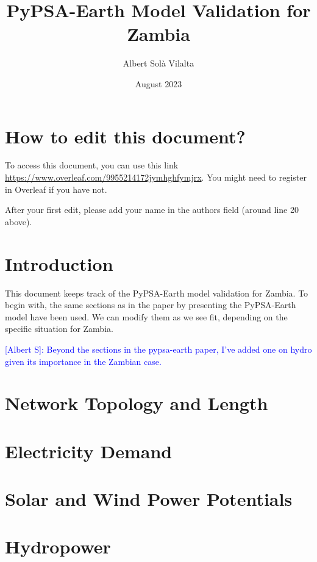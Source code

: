 \documentclass{article}
\title{PyPSA-Earth Model Validation for Zambia}
\author{Albert Sol\`a Vilalta}
\date{August 2023}
\begin{document}
\maketitle



\section{How to edit this document?}

To access this document, you can use this link \url{https://www.overleaf.com/9955214172jymhghfymjrx}. You might need to register in Overleaf if you have not.

After your first edit, please add your name in the authors field (around line 20 above).

\section{Introduction}

This document keeps track of the PyPSA-Earth model validation for Zambia. To begin with, the same sections as in the paper by \cite{Parzen23} presenting the PyPSA-Earth model have been used. We can modify them as we see fit, depending on the specific situation for Zambia.

\textcolor{blue}{[Albert S]: Beyond the sections in the pypsa-earth paper, I've added one on hydro given its importance in the Zambian case.} 


\section{Network Topology and Length}
\label{SEC:NetworkTopologyAndLength}





\section{Electricity Demand}
\label{SEC:ElectricityCDemand}



\section{Solar and Wind Power Potentials}
\label{SEC:SolarAndWindPowerPotentials}


\section{Hydropower}
\label{SEC:Hydropower}
\end{document}
